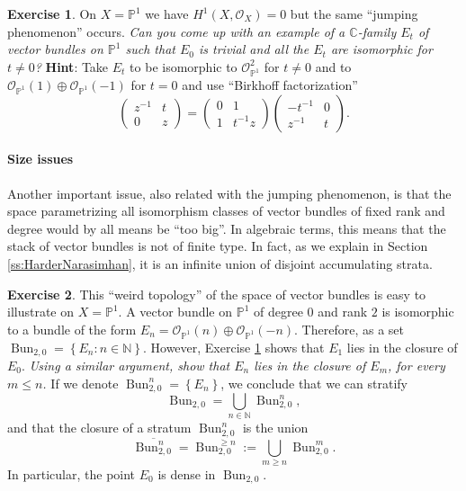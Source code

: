 \documentclass[12pt,a4paper]{amsbook}
\theoremstyle{remark} \newtheorem{rmk}[thm]{Remark}
\theoremstyle{definition} \newtheorem{defn}[thm]{Definition}
\theoremstyle{definition} \newtheorem{ex}[thm]{Example}
\theoremstyle{definition} \newtheorem{ej}{Exercise}
\newcommand{\C}{\mathbb C}
\newcommand{\bbP}{\mathbb P}
\newcommand{\sO}{\mathscr O}
\DeclareMathOperator{\Bun}{Bun}
\begin{document}
\begin{ej} \label{ej:jumpingP1}
  On $X=\bbP^1$ we have $H^1(X,\sO_X)=0$ but the same ``jumping phenomenon'' occurs. \textit{Can you come up with an example of a $\C$-family $E_t$ of vector bundles on $\bbP^1$ such that $E_0$ is trivial and all the $E_t$ are isomorphic for $t\neq 0$?} \textbf{Hint}: Take $E_t$ to be isomorphic to $\sO_{\bbP^1}^2$ for $t\neq 0$ and to $\sO_{\bbP^1}(1)\oplus\sO_{\bbP^1}(-1)$ for $t=0$ and use ``Birkhoff factorization''
  \begin{equation*}
\begin{pmatrix}
  z^{-1} & t \\
  0 & z
\end{pmatrix}=
\begin{pmatrix}
  0 & 1 \\
  1 & t^{-1}z
\end{pmatrix}
\begin{pmatrix}
  -t^{-1} & 0 \\
  z^{-1} & t
\end{pmatrix}.
  \end{equation*}
\end{ej}

\paragraph{Size issues} Another important issue, also related with the jumping phenomenon, is that the space parametrizing all isomorphism classes of vector bundles of fixed rank and degree would by all means be ``too big''. In algebraic terms, this means that the stack of vector bundles is not of finite type. In fact, as we explain in Section \ref{ss:HarderNarasimhan}, it is an infinite union of disjoint accumulating strata.

\begin{ej} \label{ej:stratificationP1}
  This ``weird topology'' of the space of vector bundles is easy to illustrate on $X=\bbP^1$. A vector bundle on $\bbP^1$ of degree $0$ and rank $2$ is isomorphic to a bundle of the form $E_n=\sO_{\bbP^1}(n)\oplus \sO_{\bbP^1}(-n)$. Therefore, as a set $\Bun_{2,0}=\left\{ E_n:n\in \mathbb{N} \right\}$. However, Exercise \ref{ej:jumpingP1} shows that $E_1$ lies in the closure of $E_0$. \textit{Using a similar argument, show that $E_n$ lies in the closure of $E_{m}$, for every $m\leq n$.} If we denote $\Bun_{2,0}^n = \left\{ E_n \right\}$, we conclude that we can stratify
  \begin{equation*}
\Bun_{2,0} = \bigcup_{n\in \mathbb{N}} \Bun_{2,0}^n,
  \end{equation*}
  and that the closure of a stratum $\Bun_{2,0}^n$ is the union
  \begin{equation*}
\overline{\Bun_{2,0}^n} = \Bun_{2,0}^{\geq n} :=\bigcup_{m\geq n} \Bun_{2,0}^m.
  \end{equation*}
  In particular, the point $E_0$ is dense in $\Bun_{2,0}$.
\end{ej}
\end{document}
